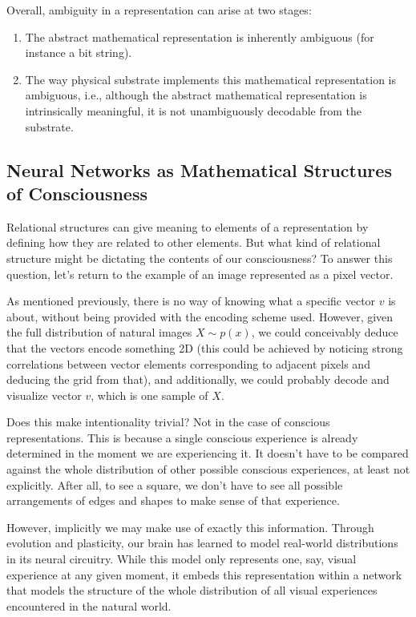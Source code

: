 \documentclass[11pt]{article}
\begin{document}
Overall, ambiguity in a representation can arise at two stages:
\begin{enumerate}
\item The abstract mathematical representation is inherently ambiguous (for instance a bit string).
\item The way physical substrate implements this mathematical representation is ambiguous, i.e., although the abstract mathematical representation is intrinsically meaningful, it is not unambiguously decodable from the substrate.
\end{enumerate}

\subsection{Neural Networks as Mathematical Structures of Consciousness}

Relational structures can give meaning to elements of a representation by defining how they are related to other elements. But what kind of relational structure might be dictating the contents of our consciousness? To answer this question, let's return to the example of an image represented as a pixel vector.

As mentioned previously, there is no way of knowing what a specific vector $v$ is about, without being provided with the encoding scheme used. However, given the full distribution of natural images $X \sim p(x)$, we could conceivably deduce that the vectors encode something 2D (this could be achieved by noticing strong correlations between vector elements corresponding to adjacent pixels and deducing the grid from that), and additionally, we could probably decode and visualize vector $v$, which is one sample of $X$.

Does this make intentionality trivial? Not in the case of conscious representations. This is because a single conscious experience is already determined in the moment we are experiencing it. It doesn't have to be compared against the whole distribution of other possible conscious experiences, at least not explicitly. After all, to see a square, we don't have to see all possible arrangements of edges and shapes to make sense of that experience.

However, implicitly we may make use of exactly this information. Through evolution and plasticity, our brain has learned to model real-world distributions in its neural circuitry. While this model only represents one, say, visual experience at any given moment, it embeds this representation within a network that models the structure of the whole distribution of all visual experiences encountered in the natural world.
\end{document}
